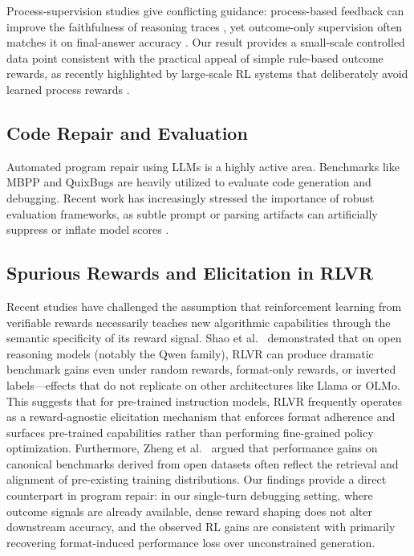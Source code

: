 \documentclass{article}
\begin{document}
Process-supervision studies give conflicting guidance: process-based feedback can improve the faithfulness of reasoning traces \cite{Lightman2023}, yet outcome-only supervision often matches it on final-answer accuracy \cite{Uesato2022}. Our result provides a small-scale controlled data point consistent with the practical appeal of simple rule-based outcome rewards, as recently highlighted by large-scale RL systems that deliberately avoid learned process rewards \cite{Guo2025}.

\subsection{Code Repair and Evaluation}
Automated program repair using LLMs is a highly active area. Benchmarks like MBPP and QuixBugs \cite{Lin2017} are heavily utilized to evaluate code generation and debugging. Recent work has increasingly stressed the importance of robust evaluation frameworks, as subtle prompt or parsing artifacts can artificially suppress or inflate model scores \cite{Tian2024, Tam2024}.

\subsection{Spurious Rewards and Elicitation in RLVR}
Recent studies have challenged the assumption that reinforcement learning from verifiable rewards necessarily teaches new algorithmic capabilities through the semantic specificity of its reward signal. Shao et al.~\cite{Shao2025Spurious} demonstrated that on open reasoning models (notably the Qwen family), RLVR can produce dramatic benchmark gains even under random rewards, format-only rewards, or inverted labels—effects that do not replicate on other architectures like Llama or OLMo. This suggests that for pre-trained instruction models, RLVR frequently operates as a reward-agnostic elicitation mechanism that enforces format adherence and surfaces pre-trained capabilities rather than performing fine-grained policy optimization. Furthermore, Zheng et al.~\cite{Zheng2025Contamination} argued that performance gains on canonical benchmarks derived from open datasets often reflect the retrieval and alignment of pre-existing training distributions. Our findings provide a direct counterpart in program repair: in our single-turn debugging setting, where outcome signals are already available, dense reward shaping does not alter downstream accuracy, and the observed RL gains are consistent with primarily recovering format-induced performance loss over unconstrained generation.
\end{document}
